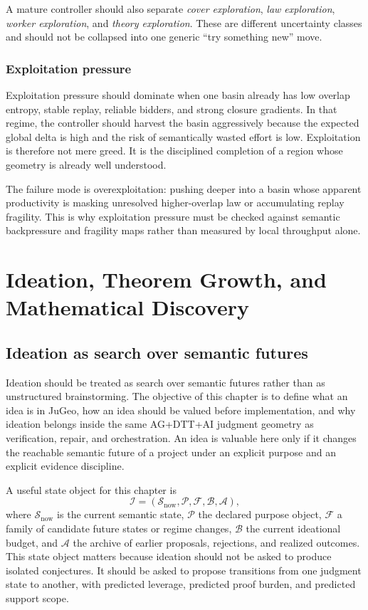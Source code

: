 \documentclass[11pt]{report}
\begin{document}
A mature controller should also separate \emph{cover exploration}, \emph{law exploration}, \emph{worker exploration}, and \emph{theory exploration}. These are different uncertainty classes and should not be collapsed into one generic ``try something new'' move.

\section{Exploitation pressure}
Exploitation pressure should dominate when one basin already has low overlap entropy, stable replay, reliable bidders, and strong closure gradients. In that regime, the controller should harvest the basin aggressively because the expected global delta is high and the risk of semantically wasted effort is low. Exploitation is therefore not mere greed. It is the disciplined completion of a region whose geometry is already well understood.

The failure mode is overexploitation: pushing deeper into a basin whose apparent productivity is masking unresolved higher-overlap law or accumulating replay fragility. This is why exploitation pressure must be checked against semantic backpressure and fragility maps rather than measured by local throughput alone.

\part{Ideation, Theorem Growth, and Mathematical Discovery}
\chapter{Ideation as search over semantic futures}
Ideation should be treated as search over semantic futures rather than as unstructured brainstorming. The objective of this chapter is to define what an idea is in JuGeo, how an idea should be valued before implementation, and why ideation belongs inside the same AG+DTT+AI judgment geometry as verification, repair, and orchestration. An idea is valuable here only if it changes the reachable semantic future of a project under an explicit purpose and an explicit evidence discipline.

A useful state object for this chapter is
\[
\mathcal{I} = (\mathcal{S}_{\mathrm{now}}, \mathcal{P}, \mathcal{F}, \mathcal{B}, \mathcal{A}),
\]
where $\mathcal{S}_{\mathrm{now}}$ is the current semantic state, $\mathcal{P}$ the declared purpose object, $\mathcal{F}$ a family of candidate future states or regime changes, $\mathcal{B}$ the current ideational budget, and $\mathcal{A}$ the archive of earlier proposals, rejections, and realized outcomes. This state object matters because ideation should not be asked to produce isolated conjectures. It should be asked to propose transitions from one judgment state to another, with predicted leverage, predicted proof burden, and predicted support scope.
\end{document}
